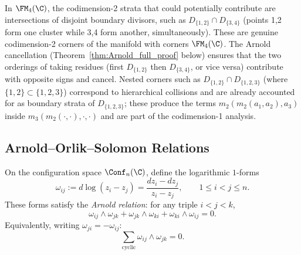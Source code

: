 \begin{remark}
\label{rem:k4_corners}
In $\FM_4(\C)$, the codimension-2 strata that could potentially contribute are intersections of disjoint boundary divisors, such as $D_{\{1,2\}} \cap D_{\{3,4\}}$ (points 1,2 form one cluster while 3,4 form another, simultaneously). These are genuine codimension-2 corners of the manifold with corners $\FM_4(\C)$. The Arnold cancellation (Theorem~\ref{thm:Arnold_full_proof} below) ensures that the two orderings of taking residues (first $D_{\{1,2\}}$ then $D_{\{3,4\}}$, or vice versa) contribute with opposite signs and cancel. Nested corners such as $D_{\{1,2\}} \cap D_{\{1,2,3\}}$ (where $\{1,2\} \subset \{1,2,3\}$) correspond to hierarchical collisions and are already accounted for as boundary strata of $D_{\{1,2,3\}}$; these produce the terms $m_2(m_2(a_1,a_2),a_3)$ inside $m_3(m_2(\cdot,\cdot),\cdot,\cdot)$ and are part of the codimension-1 analysis.
\end{remark}


\subsection{Arnold--Orlik--Solomon Relations}
\label{subsec:arnold_complete}

\begin{theorem}
\label{thm:AOS_forms}
On the configuration space $\Conf_n(\C)$, define the logarithmic $1$-forms
\[
\omega_{ij} := d\log(z_i - z_j) = \frac{dz_i - dz_j}{z_i - z_j}, \qquad 1 \leq i < j \leq n.
\]
These forms satisfy the \emph{Arnold relation}: for any triple $i < j < k$,
\begin{equation}
\label{eq:AOS}
\omega_{ij} \wedge \omega_{jk} + \omega_{jk} \wedge \omega_{ki} + \omega_{ki} \wedge \omega_{ij} = 0.
\end{equation}
Equivalently, writing $\omega_{ji} = -\omega_{ij}$:
\[
\sum_{\text{cyclic}} \omega_{ij} \wedge \omega_{jk} = 0.
\]
\end{theorem}

